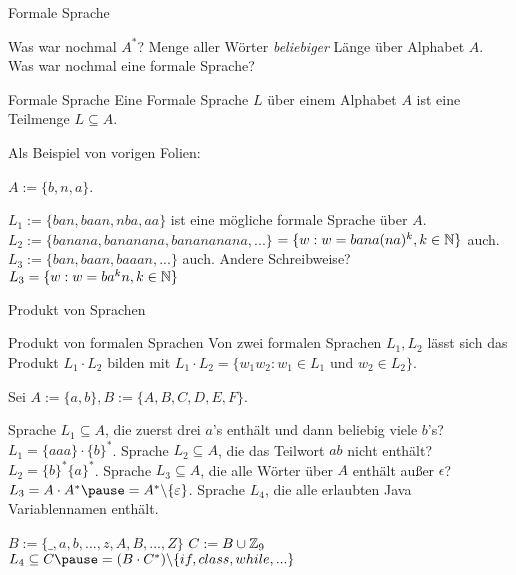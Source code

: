 \begin{frame}{Formale Sprache}
	\begin{itemize}
		\pitem Was war nochmal $A^*$? Menge aller Wörter \emph{beliebiger} Länge über Alphabet $A$.
		\pitem Was war nochmal eine formale Sprache?
	\end{itemize}
	
	\pause
	
	\begin{block}{Formale Sprache}
		Eine Formale Sprache $L$ \pause über einem Alphabet $A$ ist eine Teilmenge $L \subseteq A$.
	\end{block}

	\pause Als Beispiel von vorigen Folien:
	
	\begin{itemize}
		\pitem $A := \{b, n, a\}$.
		\begin{itemize}
			\pitem $L_1 := \{ban, baan, nba, aa\}$ ist eine mögliche formale Sprache über $A$.
			\pitem $L_2 := \{banana, bananana, banananana, ...\}$ \pause $ = \{w : w = bana(na)^k, k \in \mathbb{N}\}$ auch.
			\pitem $L_3 := \{ban, baan, baaan, ...\}$ auch. \pause Andere Schreibweise? \pause \\ $ L_3 = \{w : w = ba^kn, k \in \mathbb{N} \}$
		\end{itemize}
	\end{itemize}
\end{frame}

\begin{frame}{Produkt von Sprachen}
	\begin{block}{Produkt von formalen Sprachen}
		Von zwei formalen Sprachen $L_1, L_2$ \pause lässt sich das Produkt \pause $L_1 \cdot L_2$ \pause bilden mit \pause $L_1 \cdot L_2 = \{w_1w_2 : w_1 \in L_1 $ und $w_2 \in L_2 \}$.
	\end{block}

	Sei $A := \{a, b\}, B := \{A, B, C, D, E, F\}$.
	
	\begin{itemize}
		\pitem Sprache $L_1 \subseteq A$, die zuerst drei $a$'s enthält und dann beliebig viele $b$'s? $L_1 = \{aaa\}\cdot\{b\}^*$.
		\pitem Sprache $L_2 \subseteq A$, die das Teilwort $ab$ nicht enthält? \pause $L_2 = \{b\}^*\{a\}^*$.
		\pitem Sprache $L_3 \subseteq A$, die alle Wörter über $A$ enthält außer $\epsilon$? \pause $L_3 = A \cdot A^* \pause = A^* \backslash \{\epsilon\}$.
		\pitem Sprache $L_4$, die alle erlaubten Java Variablennamen enthält.
		\begin{itemize}
			\pitem $B := \{\_,a,b,...,z,A,B,...,Z\}$
			\pitem $C := B \cup \mathbb{Z}_9$
			\pitem $L_4 \subseteq C \pause = (B \cdot C^*) \backslash \{if, class, while, ...\}$
		\end{itemize}
	\end{itemize}
\end{frame}

